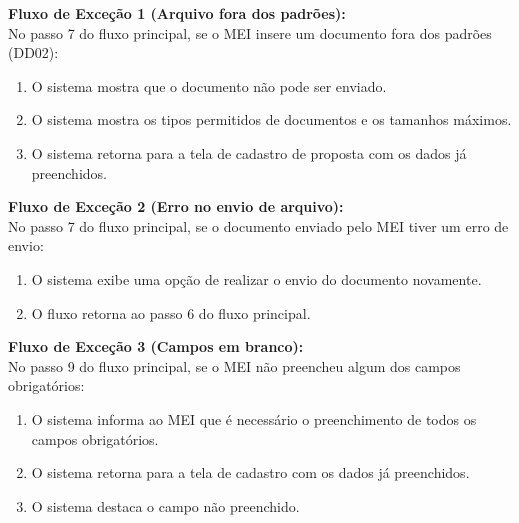 \noindent\textbf{Fluxo de Exceção 1 (Arquivo fora dos padrões):}\\ 
No passo 7 do fluxo principal, se o MEI insere um documento fora dos padrões (DD02): 
\begin{enumerate}[noitemsep, topsep=-5pt, parsep=0pt]
    \item O sistema mostra que o documento não pode ser enviado. 
    \item O sistema mostra os tipos permitidos de documentos e os tamanhos máximos.
    \item O sistema retorna para a tela de cadastro de proposta com os dados já preenchidos.
\end{enumerate}

\noindent\textbf{Fluxo de Exceção 2 (Erro no envio de arquivo):}\\ 
No passo 7 do fluxo principal, se o documento enviado pelo MEI tiver um erro de envio:
\begin{enumerate}[noitemsep, topsep=-5pt, parsep=0pt]
    \item O sistema exibe uma opção de realizar o envio do documento novamente. 
    \item O fluxo retorna ao passo 6 do fluxo principal. 
\end{enumerate}

\noindent\textbf{Fluxo de Exceção 3 (Campos em branco):}\\ 
No passo 9 do fluxo principal, se o MEI não preencheu algum dos campos obrigatórios: 
\begin{enumerate}[noitemsep, topsep=-5pt, parsep=0pt]
    \item O sistema informa ao MEI que é necessário o preenchimento de todos os campos obrigatórios. 
    \item O sistema retorna para a tela de cadastro com os dados já preenchidos. 
    \item O sistema destaca o campo não preenchido. 
\end{enumerate}


